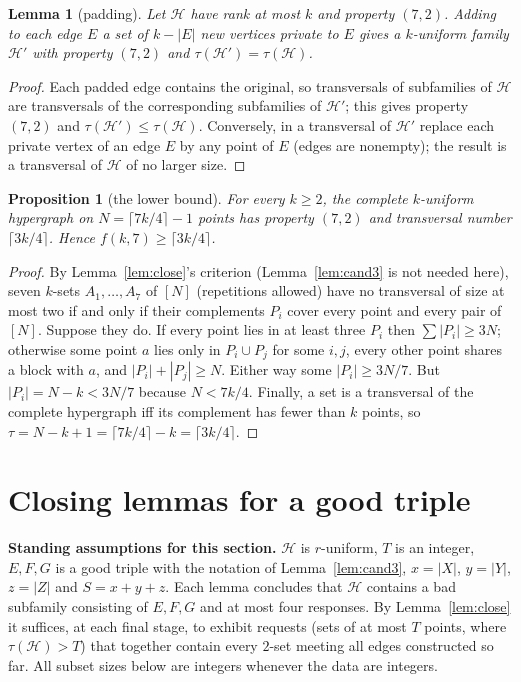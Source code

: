 \documentclass[11pt]{amsart}
\newtheorem{lemma}[theorem]{Lemma}
\newtheorem{proposition}[theorem]{Proposition}
\theoremstyle{definition}
\theoremstyle{remark}
\newcommand{\cH}{\mathcal H}
\newcommand{\ceil}[1]{\lceil #1\rceil}
\begin{document}
\begin{lemma}[padding]\label{lem:pad}
Let $\cH$ have rank at most $k$ and property $(7,2)$. Adding to each edge $E$ a set of $k-|E|$ new vertices private to $E$ gives a $k$-uniform family $\cH'$ with property $(7,2)$ and $\tau(\cH')=\tau(\cH)$.
\end{lemma}
\begin{proof}
Each padded edge contains the original, so transversals of subfamilies of $\cH$ are transversals of the corresponding subfamilies of $\cH'$; this gives property $(7,2)$ and $\tau(\cH')\le\tau(\cH)$. Conversely, in a transversal of $\cH'$ replace each private vertex of an edge $E$ by any point of $E$ (edges are nonempty); the result is a transversal of $\cH$ of no larger size.
\end{proof}

\begin{proposition}[the lower bound]\label{prop:lower}
For every $k\ge2$, the complete $k$-uniform hypergraph on $N=\ceil{7k/4}-1$ points has property $(7,2)$ and transversal number $\ceil{3k/4}$. Hence $f(k,7)\ge\ceil{3k/4}$.
\end{proposition}
\begin{proof}
By Lemma~\ref{lem:close}'s criterion (Lemma~\ref{lem:cand3} is not needed here), seven $k$-sets $A_1,\dots,A_7$ of $[N]$ (repetitions allowed) have no transversal of size at most two if and only if their complements $P_i$ cover every point and every pair of $[N]$. Suppose they do. If every point lies in at least three $P_i$ then $\sum|P_i|\ge3N$; otherwise some point $a$ lies only in $P_i\cup P_j$ for some $i,j$, every other point shares a block with $a$, and $|P_i|+|P_j|\ge N$. Either way some $|P_i|\ge3N/7$. But $|P_i|=N-k<3N/7$ because $N<7k/4$. Finally, a set is a transversal of the complete hypergraph iff its complement has fewer than $k$ points, so $\tau=N-k+1=\ceil{7k/4}-k=\ceil{3k/4}$.
\end{proof}

\section{Closing lemmas for a good triple}\label{sec:closing}

\noindent\textbf{Standing assumptions for this section.} $\cH$ is $r$-uniform, $T$ is an integer, $E,F,G$ is a good triple with the notation of Lemma~\ref{lem:cand3}, $x=|X|$, $y=|Y|$, $z=|Z|$ and $S=x+y+z$. Each lemma concludes that $\cH$ contains a bad subfamily consisting of $E,F,G$ and at most four responses. By Lemma~\ref{lem:close} it suffices, at each final stage, to exhibit requests (sets of at most $T$ points, where $\tau(\cH)>T$) that together contain every $2$-set meeting all edges constructed so far. All subset sizes below are integers whenever the data are integers.
\end{document}
